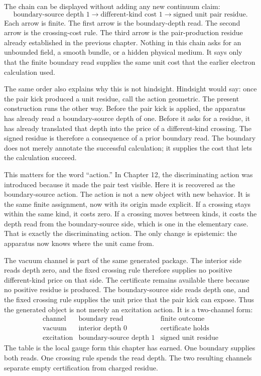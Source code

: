 The chain can be displayed without adding any new continuum claim:
\[
  \text{boundary-source depth }1
  \longrightarrow
  \text{different-kind cost }1
  \longrightarrow
  \text{signed unit pair residue}.
\]
Each arrow is finite. The first arrow is the boundary-depth read. The second arrow
is the crossing-cost rule. The third arrow is the pair-production residue already
established in the previous chapter. Nothing in this chain asks for an unbounded
field, a smooth bundle, or a hidden physical medium. It says only that the finite
boundary read supplies the same unit cost that the earlier electron calculation used.

The same order also explains why this is not hindsight. Hindsight would say: once
the pair kick produced a unit residue, call the action geometric. The present
construction runs the other way. Before the pair kick is applied, the apparatus has
already read a boundary-source depth of one. Before it asks for a residue, it has
already translated that depth into the price of a different-kind crossing. The
signed residue is therefore a consequence of a prior boundary read. The boundary
does not merely annotate the successful calculation; it supplies the cost that lets
the calculation succeed.

This matters for the word ``action.'' In Chapter 12, the discriminating action was
introduced because it made the pair test visible. Here it is recovered as the
boundary-source action. The action is not a new object with new behavior. It is the
same finite assignment, now with its origin made explicit. If a crossing stays
within the same kind, it costs zero. If a crossing moves between kinds, it costs the
depth read from the boundary-source side, which is one in the elementary case. That
is exactly the discriminating action. The only change is epistemic: the apparatus
now knows where the unit came from.

The vacuum channel is part of the same generated package. The interior side reads
depth zero, and the fixed crossing rule therefore supplies no positive different-kind
price on that side. The certificate remains available there because no positive
residue is produced. The boundary-source side reads depth one, and the fixed
crossing rule supplies the unit price that the pair kick can expose. Thus the
generated object is not merely an excitation action. It is a two-channel form:
\[
\begin{array}{c|c|c}
\text{channel} & \text{boundary read} & \text{finite outcome} \\
\hline
\text{vacuum} & \text{interior depth }0 & \text{certificate holds} \\
\text{excitation} & \text{boundary-source depth }1 & \text{signed unit residue}
\end{array}
\]
The table is the local gauge form this chapter has earned. One boundary supplies
both reads. One crossing rule spends the read depth. The two resulting channels
separate empty certification from charged residue.

